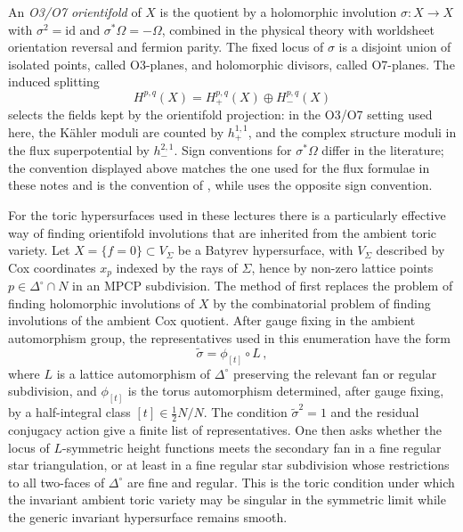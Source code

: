 \begin{definition}[O3/O7 orientifold of $X$]\label{def:orientifold}
An \emph{O3/O7 orientifold} of $X$ is the quotient by a
holomorphic involution $\sigma:X\to X$ with $\sigma^2=\mathrm{id}$
and $\sigma^*\Omega=-\Omega$, combined in the physical theory with
worldsheet orientation reversal and fermion parity.  The fixed locus
of $\sigma$ is a disjoint union of isolated points, called
O3-planes, and holomorphic divisors, called O7-planes.  The induced
splitting
\begin{equation}
    H^{p,q}(X)=H^{p,q}_{+}(X)\oplus H^{p,q}_{-}(X)
\end{equation}
selects the fields kept by the orientifold projection: in the
O3/O7 setting used here, the K\"ahler moduli are counted by
$h^{1,1}_{+}$, and the complex structure moduli in the flux
superpotential by $h^{2,1}_{-}$.  Sign conventions for
$\sigma^*\Omega$ differ in the literature; the convention displayed
above matches the one used for the flux formulae in these notes and
is the convention of \cite{Giddings:2001yu}, while
\cite{Grimm:2004uq} uses the opposite sign convention.
\end{definition}

For the toric hypersurfaces used in these lectures there is a
particularly effective way of finding orientifold involutions that
are inherited from the ambient toric variety.  Let
$X=\{f=0\}\subset V_\Sigma$ be a Batyrev hypersurface, with
$V_\Sigma$ described by Cox coordinates $x_p$ indexed by the rays
of $\Sigma$, hence by non-zero lattice points
$p\in\Delta^\circ\cap N$ in an MPCP subdivision.  The method of
\cite{Moritz:2023jdb} first replaces the problem of finding
holomorphic involutions of $X$ by the combinatorial problem of
finding involutions of the ambient Cox quotient.  After gauge fixing
in the ambient automorphism group, the representatives used in this
enumeration have the form
\begin{equation}
    \widetilde\sigma=\phi_{[t]}\circ L\, ,
\end{equation}
where $L$ is a lattice automorphism of $\Delta^\circ$ preserving the
relevant fan or regular subdivision, and $\phi_{[t]}$ is the torus
automorphism determined, after gauge fixing, by a half-integral
class $[t]\in \frac{1}{2}N/N$.  The condition
$\widetilde\sigma^2=1$ and the residual conjugacy action give a
finite list of representatives.  One then asks whether the locus of
$L$-symmetric height functions meets the secondary fan in a fine
regular star triangulation, or at least in a fine regular star
subdivision whose restrictions to all two-faces of
$\Delta^\circ$ are fine and regular.  This is the toric condition
under which the invariant ambient toric variety may be singular in
the symmetric limit while the generic invariant hypersurface remains
smooth.

